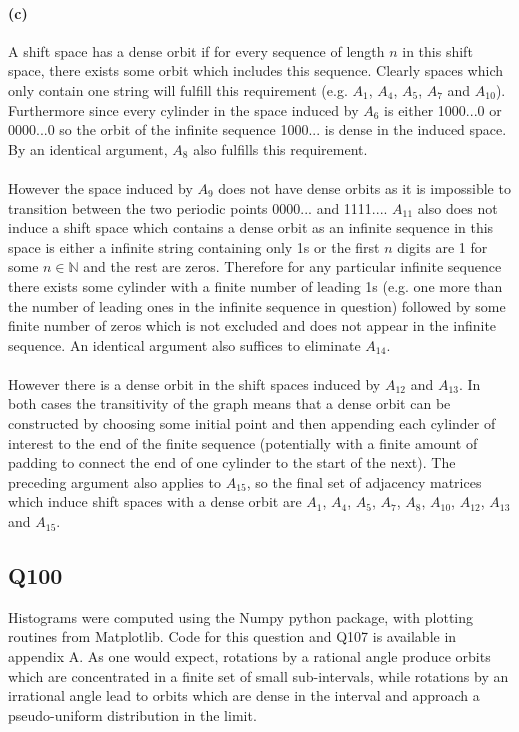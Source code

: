 \documentclass{article}
\begin{document}
\paragraph{(c)}
A shift space has a dense orbit if for every sequence of length $n$ in this shift space, there exists 
some orbit which includes this sequence. Clearly spaces which only contain one string will fulfill this requirement (e.g. $A_1$, $A_4$, $A_5$, $A_7$ and $A_{10}$). Furthermore 
since every cylinder in the space induced by $A_6$ is either 1000...0 or 0000...0 so the orbit of the infinite sequence 1000... is dense in the induced space. By an identical argument, 
$A_8$ also fulfills this requirement. 

\paragraph{}
However the space induced by $A_9$ does not have dense orbits as it is impossible to transition 
between the two periodic points 0000... and 1111.... $A_{11}$ also does not induce a shift space which contains a dense orbit as an 
infinite sequence in this space is either a infinite string containing only 1s or the 
first $n$ digits are 1 for some $n \in \mathbb{N}$ and the rest are zeros. Therefore for 
any particular infinite sequence there exists some cylinder with a finite number of leading 1s (e.g. one more than the 
number of leading ones in the infinite sequence in question) followed by some finite number of 
zeros which is not excluded and does not appear in the infinite sequence. An identical argument also suffices 
to eliminate $A_{14}$. 

\paragraph{}
However there is a dense orbit in the shift spaces induced by $A_{12}$ and $A_{13}$. In both 
cases the transitivity of the graph means that a dense orbit can be constructed by choosing some initial point 
and then appending each cylinder of interest to the end of the finite sequence (potentially with 
a finite amount of padding to connect the end of one cylinder to the start of the next). The 
preceding argument also applies to $A_{15}$, so the final set of adjacency matrices which induce 
shift spaces with a dense orbit are $A_1$, $A_4$, $A_5$, $A_7$, $A_8$, $A_{10}$, $A_{12}$, $A_{13}$ 
and $A_{15}$.

\subsection*{Q100}
Histograms were computed using the Numpy python package, with plotting routines from Matplotlib. 
Code for this question and Q107 is available in appendix A. As one would expect, rotations by 
a rational angle produce orbits which are concentrated in a finite set of small sub-intervals, 
while rotations by an irrational angle lead to orbits which are dense in the interval and 
approach a pseudo-uniform distribution in the limit.
\end{document}
